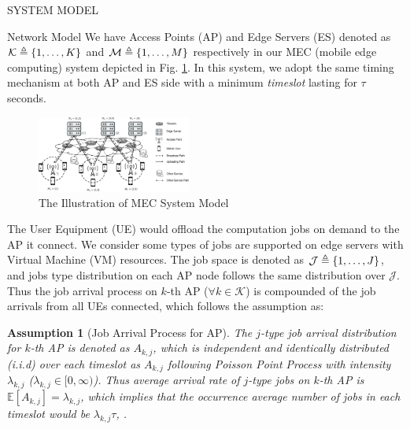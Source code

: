 \documentclass[10pt, conference, letterpaper]{IEEEtran}
\newtheorem{assumption}{Assumption}
\newcommand{\define}{\triangleq}
\DeclarePairedDelimiter{\set}{\{}{\}}
\newcommand{\apSet}{\mathcal{K}}
\newcommand{\jSpace}{\mathcal{J}}
\begin{document}
    \begin{section}{SYSTEM MODEL}
        \label{sec:model}
        \begin{subsection}{Network Model}
            We have Access Points (AP) and Edge Servers (ES) denoted as $\apSet \define \set{1,\dots,K}$ and $\mathcal{M} \define \set{1,\dots,M}$ respectively in our MEC (mobile edge computing) system depicted in Fig. \ref{fig:system}. In this system, we adopt the same timing mechanism at both AP and ES side with a minimum \emph{timeslot} lasting for $\tau$ seconds.

            \begin{figure}[ht]
                \centering
                \includegraphics[width=0.45\textwidth, trim={0.5cm 0.5cm 0.5cm 0.5cm}, clip]{system-model.pdf}
                \caption{The Illustration of MEC System Model}
                \label{fig:system}
            \end{figure}

            The User Equipment (UE) would offload the computation jobs on demand to the AP it connect.
            We consider some types of jobs are supported on edge servers with Virtual Machine (VM) resources. The job space is denoted as $\jSpace \define \set{1,\dots, J}$, and jobs type distribution on each AP node follows the same distribution over $\jSpace$.
            Thus the job arrival process on $k$-th AP ($\forall k\in\apSet$) is compounded of the job arrivals from all UEs connected, which follows the assumption as:
            \begin{assumption}[Job Arrival Process for AP]
                The $j$-type job arrival distribution for $k$-th AP is denoted as $A_{k,j}$, which is independent and identically distributed (i.i.d) over each timeslot as $A_{k,j}$ following Poisson Point Process with intensity $\lambda_{k,j}$ ($\lambda_{k,j}\in[0,\infty)$). Thus average arrival rate of $j$-type jobs on $k$-th AP is $\mathbb{E}[A_{k,j}]=\lambda_{k,j}$, which implies that the occurrence average number of jobs in each timeslot would be $\lambda_{k,j}\tau$, .
            \end{assumption}


\end{subsection}
\end{section}
\end{document}
